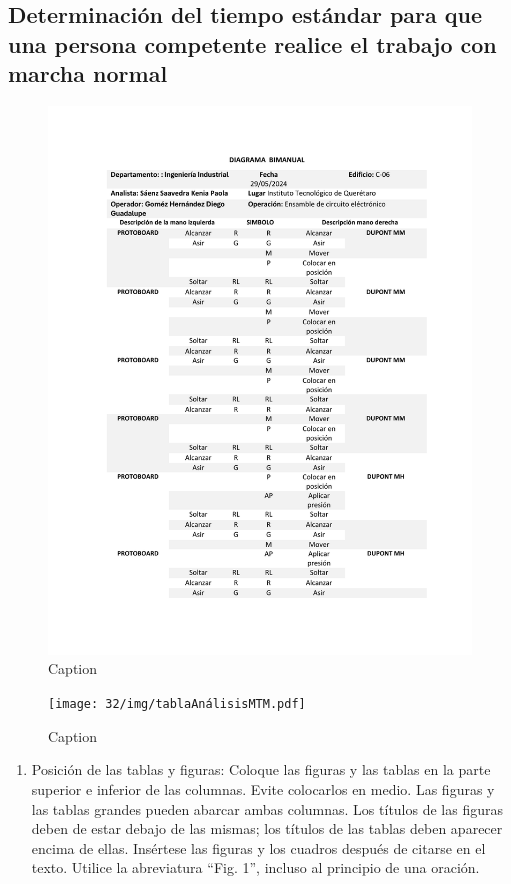     \subsection{Determinación del tiempo estándar para que una persona competente realice el trabajo con marcha normal}
    \begin{figure}[H]
        \centering
        \includegraphics[scale=0.6]{32/img/diagramaBimanual.pdf}
        \caption{Caption}
        \label{fig:enter-label}
    \end{figure}
    \begin{figure}[H]
        \centering
        \texttt{[image: 32/img/tablaAnálisisMTM.pdf]}
        \caption{Caption}
        \label{fig:enter-label}
    \end{figure}
    
    \begin{enumerate}
        \item Posición de las tablas y figuras: Coloque las figuras y las tablas en la parte superior e inferior de las columnas. Evite colocarlos en medio. Las figuras y las tablas grandes pueden abarcar ambas columnas. Los títulos de las figuras deben de estar debajo de las mismas; los títulos de las tablas deben aparecer encima de ellas. Insértese las figuras y los cuadros después de citarse en el texto. Utilice la abreviatura “Fig. 1”, incluso al principio de una oración. 
    \end{enumerate}
    
